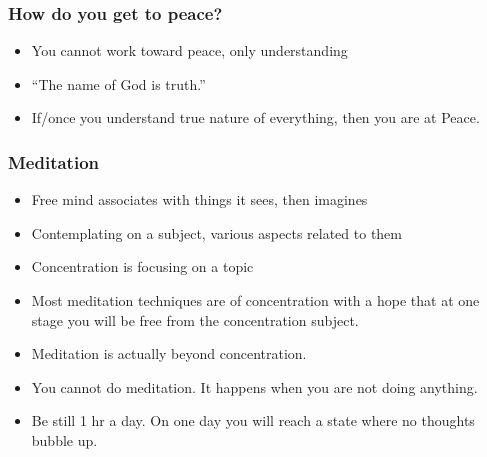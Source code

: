\begin{frame}[fragile]\frametitle{How do you get to peace?}

	\begin{itemize}
	\item You cannot work toward peace, only understanding
	\item ``The name of God is truth.''
	\item If/once you understand true nature of everything, then you are at Peace.
	\end{itemize}

\end{frame}

\begin{frame}[fragile]\frametitle{Meditation}

	\begin{itemize}

	\item Free mind associates with things it sees, then imagines
	\item Contemplating on a subject, various aspects related to them
	\item Concentration is focusing on a topic
	\item Most meditation techniques are of concentration with a hope that at one stage you will be free from the concentration subject. 
	\item Meditation is actually beyond concentration. 
	\item You cannot do meditation. It happens when you are not doing anything. 
	\item Be still 1 hr a day. On one day you will reach a state where no thoughts bubble up.
	\end{itemize}

\end{frame}

